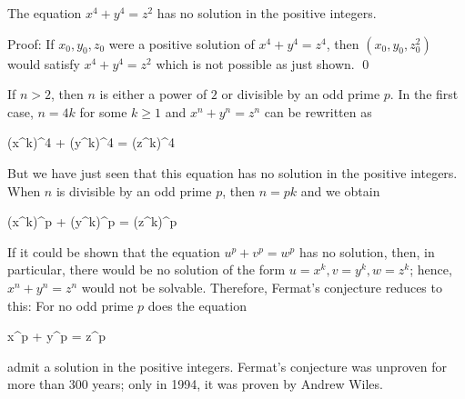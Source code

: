 \begin{theorem}
    The equation $x^4 + y^4 = z^2$ has no solution in the positive integers.
\end{theorem}

Proof: If $x_0, y_0, z_0$ were a positive solution of $x^4 + y^4 = z^4$, then $(x_0, y_0, z_0^2)$ would satisfy $x^4 + y^4 =z^2$ which is not possible as just shown. \qed

If $n > 2$, then $n$ is either a power of $2$ or divisible by an odd prime $p$. In the first case, $n =4k$ for some $k \geq 1$ and $x^n + y^n = z^n$ can be rewritten as

\bee
(x^k)^4 + (y^k)^4 = (z^k)^4
\eee

But we have just seen that this equation has no solution in the positive integers. When $n$ is divisible by an odd prime $p$, then $n = pk$ and we obtain

\bee
(x^k)^p + (y^k)^p = (z^k)^p
\eee

If it could be shown that the equation $u^p + v^p = w^p$ has no solution, then, in particular, there would be no solution of the form $u = x^k, v = y^k, w = z^k$; hence, $x^n + y^n = z^n$ would not be solvable. Therefore, Fermat’s conjecture reduces to this: For no odd prime $p$ does the equation 

\bee
x^p + y^p = z^p
\eee

admit a solution in the positive integers. Fermat's conjecture was unproven for more than 300 years; only in 1994, it was proven by Andrew Wiles.



